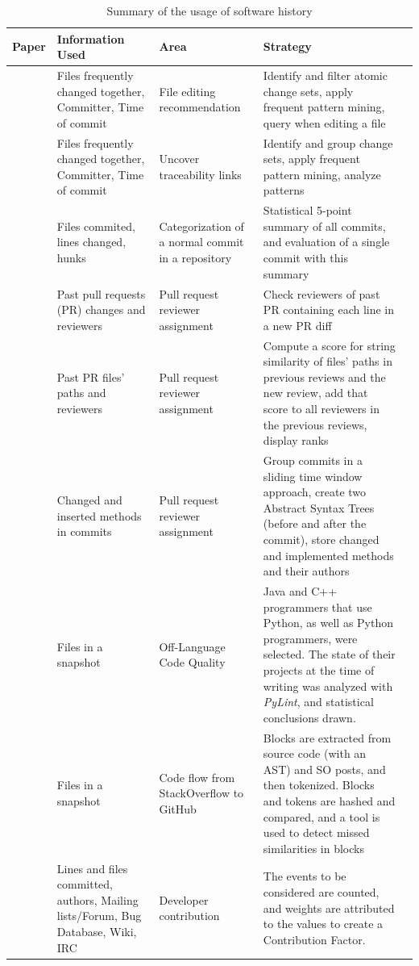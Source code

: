 \begin{table}[h!]
    \centering
    \caption{Summary of the usage of software history}
    \tiny
    \begin{tabular}{|P|L|L|L|L|}
        \hline
         Paper & Information Used  & Area & Strategy \\
         \hline
         \cite{Ying_2004} & Files frequently changed together, Committer, Time of commit & File editing recommendation & Identify and filter atomic change sets, apply frequent pattern mining, query when editing a file \\
         \hline
         \cite{Kagdi_2007} & Files frequently changed together, Committer, Time of commit & Uncover traceability links & Identify and group change sets, apply frequent pattern mining, analyze patterns \\
         \hline
         \cite{Alali_2008} & Files commited, lines changed, hunks & Categorization of a normal commit in a repository & Statistical 5-point summary of all commits, and evaluation of a single commit with this summary \\
         \hline
         \cite{Balachandran_2013} & Past pull requests (PR) changes and reviewers & Pull request reviewer assignment & Check reviewers of past PR containing each line in a new PR diff  \\
         \hline
         \cite{Thongtanunam_2015} & Past PR files' paths and reviewers & Pull request reviewer assignment & Compute a score for string similarity of files' paths in previous reviews and the new review, add that score to all reviewers in the previous reviews, display ranks\\
         \hline
         \cite{Schuler_2008} & Changed and inserted methods in commits & Pull request reviewer assignment & Group commits in a sliding time window approach, create two Abstract Syntax Trees (before and after the commit), store changed and implemented methods and their authors \\
         \hline
         \cite{Horschig_2018} & Files in a snapshot & Off-Language Code Quality & Java and C++ programmers that use Python, as well as Python programmers, were selected. The state of their projects at the time of writing was analyzed with \textit{PyLint}, and statistical conclusions drawn. \\
         \hline
         \cite{Yang_2017} & Files in a snapshot & Code flow from StackOverflow to GitHub & Blocks are extracted from source code (with an AST) and SO posts, and then tokenized. Blocks and tokens are hashed and compared, and a tool is used to detect missed similarities in blocks\\
         \hline
         \cite{Gousios_2008} & Lines and files committed, authors, Mailing lists/Forum, Bug Database, Wiki, IRC & Developer contribution & The events to be considered are counted, and weights are attributed to the values to create a Contribution Factor. \\
         \hline
    \end{tabular}
    \label{tab:software-history-usage}
\end{table}


